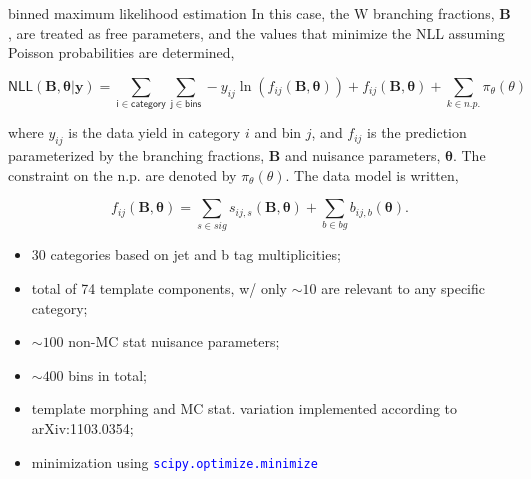 \begin{frame}{}
\smaller 

    \begin{block}{\smaller binned maximum likelihood estimation}
        In this case, the W branching fractions, $\mathbf{B}$, are treated as free parameters, and the values that minimize the NLL assuming Poisson probabilities are determined,

        \begin{equation*}
            \mathsf{NLL}(\boldsymbol{B}, \boldsymbol{\theta}|\mathbf{y}) = \sum_{\mathsf{i\in category}} 
            \sum_{\mathsf{j \in bins}} -y_{ij}\ln(f_{ij}(\boldsymbol{B}, \boldsymbol{\theta})) + f_{ij}(\boldsymbol{B}, \boldsymbol{\theta}) + \sum_{k\in n.p.}\pi_\theta (\theta)
        \end{equation*}

        where $y_{ij}$ is the data yield in category $i$ and bin $j$, and $f_{ij}$ is the prediction
        parameterized by the branching fractions, $\mathbf{B}$ and nuisance parameters,
        $\boldsymbol{\theta}$. The constraint on the n.p. are denoted by $\pi_{\theta}(\theta)$. The
        data model is written, 

        \begin{equation*}
            f_{ij}(\boldsymbol{B}, \boldsymbol{\theta}) = \sum_{s\in sig} s_{ij,s}(\boldsymbol{B}, \boldsymbol{\theta}) + \sum_{b\in bg} b_{ij,b}(\boldsymbol{\theta}). 
        \end{equation*}

    \end{block}

    \begin{itemize}
        \smaller
        \item 30 categories based on jet and b tag multiplicities;
        \item total of 74 template components, w/ only $\sim 10$ are relevant to any specific category;
        \item $\sim 100$ non-MC stat nuisance parameters;
        \item $\sim 400$ bins in total;
        \item template morphing and MC stat. variation implemented according to arXiv:1103.0354;
        \item minimization using \textcolor{blue}{\texttt{scipy.optimize.minimize}}
    \end{itemize}
    
\end{frame}



